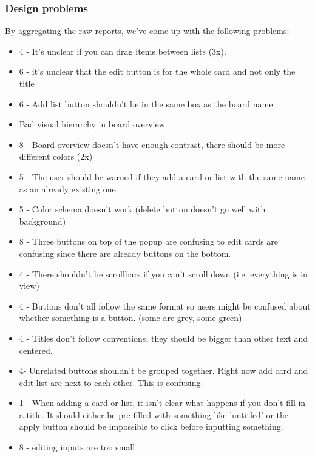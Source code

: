 \subsubsection{Design problems}
By aggregating the raw reports, we've come up with the following problems:
\begin{itemize}
    \item 4 - It's unclear if you can drag items between lists (3x).
    \item 6 - it's unclear that the edit button is for the whole card and not only the title
    \item 6 - Add list button shouldn't be in the same box as the board name
    \item Bad visual hierarchy in board overview
    \item 8 - Board overview doesn't have enough contrast, there should be more different colors (2x)
    \item 5 - The user should be warned if they add a card or list with the same name as an already existing one.
    \item 5 - Color schema doesn't work (delete button doesn't go well with background)
    \item 8 - Three buttons on top of the popup are confusing to edit cards are confusing since there are already buttons on the bottom.
    \item 4 - There shouldn't be scrollbars if you can't scroll down (i.e. everything is in view)
    \item 4 - Buttons don't all follow the same format so users might be confused about whether something is a button. (some are grey, some green)
    \item 4 - Titles don't follow conventions,
    they should be bigger than other text and centered.
    \item 4- Unrelated buttons shouldn't be grouped together. Right now add card and edit list are next to each other. This is confusing.
    \item 1 - When adding a card or list, it isn't clear what happens if you don't fill in a title. It should either be pre-filled with something like 'untitled' or the apply button should be impossible to click before inputting something.
    \item 8 - editing inputs are too small
\end{itemize}
